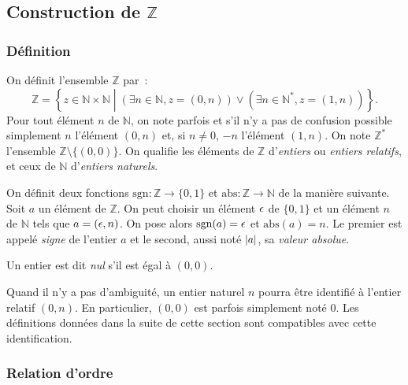 \subsection{Construction de \texorpdfstring{$\mathbb{Z}$}{Z}}

\subsubsection{Définition}

On définit l'ensemble $\mathbb{Z}$ par : 
\begin{equation*}
    \mathbb{Z} = \left\lbrace z \in \mathbb{N} \times \mathbb{N} \middle\vert (\exists n \in \mathbb{N}, z = (0,n)) \vee (\exists n \in \mathbb{N}^*, z = (1,n)) \right\rbrace.
\end{equation*}
Pour tout élément $n$ de $\mathbb{N}$, on note parfois et s'il n'y a pas de confusion possible simplement $n$ l'élément $(0,n)$ et, si $n \neq 0$, $-n$ l'élément $(1,n)$.
On note $\mathbb{Z}^*$ l'ensemble $\mathbb{Z} \setminus \lbrace (0,0) \rbrace$.
On qualifie les éléments de $\mathbb{Z}$ d'\textit{entiers} ou \textit{entiers relatifs}, et ceux de $\mathbb{N}$ d'\textit{entiers naturels}. 

On définit deux fonctions $\mathrm{sgn}: \mathbb{Z} \to \lbrace 0, 1 \rbrace$ et $\mathrm{abs}: \mathbb{Z} \to \mathbb{N}$ de la manière suivante. 
Soit $a$ un élément de $\mathbb{Z}$. 
On peut choisir un élément $\epsilon$ de $\lbrace 0, 1 \rbrace$ et un élément $n$ de $\mathbb{N}$ tels que $a = (\epsilon,n)$. 
On pose alors $\mathrm{sgn}(a) = \epsilon$ et $\mathrm{abs}(a) = n$. 
Le premier est appelé \textit{signe} de l'entier $a$ et le second, aussi noté $\left\lvert a \right\rvert$, sa \textit{valeur absolue}.

Un entier est dit \textit{nul} s'il est égal à $(0,0)$.

Quand il n'y a pas d'ambiguité, un entier naturel $n$ pourra être identifié à l'entier relatif $(0,n)$. 
En particulier, $(0,0)$ est parfois simplement noté $0$.
Les définitions données dans la suite de cette section sont compatibles avec cette identification.

\subsubsection{Relation d'ordre}

